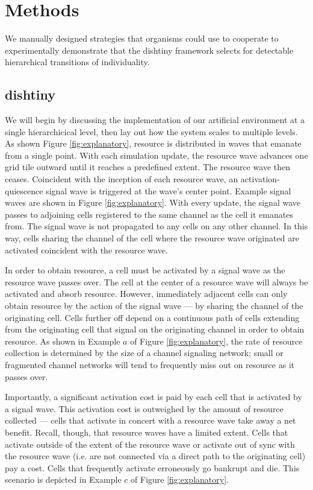 \section{Methods}

We manually designed strategies that organisms could use to cooperate to experimentally demonstrate that the dishtiny framework selects for detectable hierarchical transitions of individuality.

\subsection{dishtiny}



We will begin by discussing the implementation of our artificial environment at a single hierarchicical level, then lay out how the system scales to multiple levels.
As shown Figure \ref{fig:explanatory}, resource is distributed in waves that emanate from a single point.
With each simulation update, the resource wave advances one grid tile outward until it reaches a predefined extent.
The resource wave then ceases.
Coincident with the inception of each resource wave, an activation-quiescence signal wave is triggered at the wave's center point.
Example signal waves are shown in Figure \ref{fig:explanatory}.
With every update, the signal wave passes to adjoining cells registered to the same channel as the cell it emanates from.
The signal wave is not propagated to any cells on any other channel.
In this way, cells sharing the channel of the cell where the resource wave originated are activated coincident with the resource wave.

In order to obtain resource, a cell must be activated by a signal wave as the resource wave passes over.
The cell at the center of a resource wave will always be activated and absorb resource.
However, immediately adjacent cells can only obtain resource by the action of the signal wave --- by sharing the channel of the originating cell.
Cells further off depend on a continuous path of cells extending from the originating cell that signal on the originating channel in order to obtain resource.
As shown in Example $a$ of Figure \ref{fig:explanatory}, the rate of resource collection is determined by the size of a channel signaling network; small or fragmented channel networks will tend to frequently miss out on resource as it passes over.

Importantly, a significant activation cost is paid by each cell that is activated by a signal wave.
This activation cost is outweighed by the amount of resource collected --- cells that activate in concert with a resource wave take away a net benefit.
Recall, though, that resource waves have a limited extent.
Cells that activate outside of the extent of the resource wave or activate out of sync with the resource wave (i.e. are not connected via a direct path to the originating cell) pay a cost.
Cells that frequently activate erroneously go bankrupt and die.
This scenario is depicted in Example $c$ of Figure \ref{fig:explanatory}.

